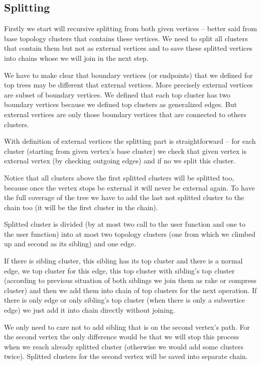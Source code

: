 \subsection{Splitting}

Firstly we start will recursive splitting from both given vertices -- better
said from base topology clusters that contains these vertices. We need to split
all clusters that contain them but not as {\I external vertices} and to save
these splitted vertices into {\I chains} whose we will join in the next step.

We have to make clear that {\I boundary vertices} (or endpoints) that we defined
for top trees may be different that {\I external vertices}. More precisely
external vertices are subset of boundary vertices. We defined that each top
cluster has two boundary vertices because we defined top clusters as generalized
edges. But external vertices are only those boundary vertices that are connected
to others clusters.

With definition of external vertices the splitting part is straightforward --
for each cluster (starting from given vertex's base cluster) we check that given
vertex is external vertex (by checking outgoing edges) and if no we split this
cluster.

Notice that all clusters above the first splitted clusters will be splitted too,
because once the vertex stops be external it will never be external again. To
have the full coverage of the tree we have to add the last not splitted cluster
to the chain too (it will be the first cluster in the chain).

Splitted cluster is divided (by at most two call to the \Split{} user function
and one to the \Destroy{} user function) into at most two topology clusters (one
from which we climbed up and second as its sibling) and one edge.

If there is sibling cluster, this sibling has its top cluster and there is a
normal edge, we \Create{} top cluster for this edge, \Join{} this top cluster
with sibling's top cluster (according to previous situation of both siblings we
join them as rake or compress cluster) and then we add them into chain of top
clusters for the next operation. If there is only edge or only sibling's top
cluster (when there is only a subvertice edge) we just add it into chain
directly without joining.

We only need to care not to add sibling that is on the second vertex's path.
For the second vertex the only difference would be that we will stop this
process when we reach already splitted cluster (otherwise we would add some
clusters twice). Splitted clusters for the second vertex will be saved into
separate chain.

